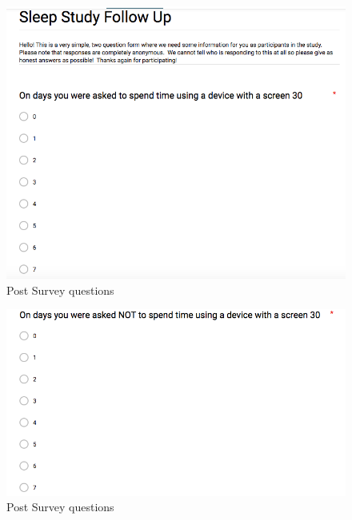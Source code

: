 \documentclass[12pt,]{article}
\begin{document}
\begin{figure}[H]

{\centering \includegraphics[width=0.7\linewidth]{img/post_followup_1} 

}

\caption{Post Survey questions}\label{fig:unnamed-chunk-13}
\end{figure}\begin{figure}[H]

{\centering \includegraphics[width=0.7\linewidth]{img/post_followup_2} 

}

\caption{Post Survey questions}\label{fig:unnamed-chunk-13}
\end{figure}
\end{document}
